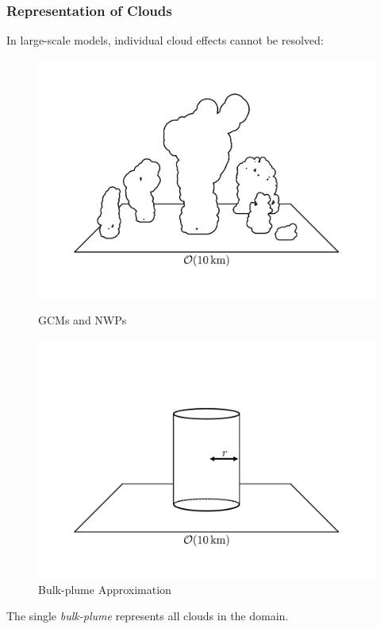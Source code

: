 \documentclass{beamer}
\begin{document}
\begin{frame}
    \frametitle{Representation of Clouds}
    In large-scale models, individual cloud effects cannot be resolved:
    \begin{figure}
        \centering
        \begin{minipage}{.5\textwidth}
            \centering
            \includegraphics[width=\linewidth]{img/field.pdf}
            \caption{GCMs and NWPs}
        \end{minipage}%
        \begin{minipage}{.5\textwidth}
            \centering
            \includegraphics[width=\linewidth]{img/cyl.pdf}
            \caption{Bulk-plume Approximation}
        \end{minipage}
    \end{figure}
    The single \emph{bulk-plume} represents all clouds in the domain.
\end{frame}
\end{document}
